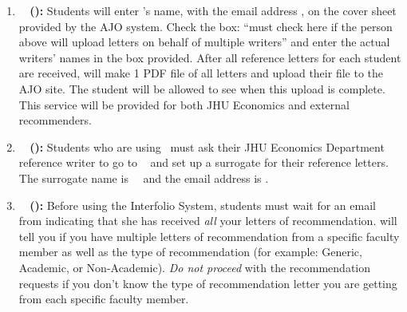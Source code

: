 \documentclass{\econtex}
\begin{document}
\begin{enumerate}
\begin{itemize}
  \end{itemize}

\item \textbf{\AJO ~ (\AJOLink):}
  Students will enter {\JMStaffName}'s name, with the email address \jmstaffemail, on the cover sheet provided by the AJO system. Check the box: ``must check here if the person above will upload letters on behalf of multiple writers'' and enter the actual writers' names in the box provided. After all reference letters for each student are received, {\JMStaffName} will make 1 PDF file of all letters and upload their file to the AJO site. The student will be allowed to see when this upload is complete. This service will be provided for both JHU Economics and external recommenders.

\item \textbf{\AEA ~ (\AEALink):}
  Students who are using \AEA~must ask their JHU Economics Department reference writer to go to \AEARecLink~ and set up a surrogate for their reference letters. The surrogate name is {\JMStaffName}~{\JMStaffNameLast}~and the email address is \jmstaffemail. %

\hypertarget{students-interfolio}{}
\item \textbf{\Interfolio ~ (\InterfolioLink):}
  Before using the Interfolio System, students must wait for an email from {\JMStaffName} indicating that she has received \textit{all} your letters of recommendation. {\JMStaffName} will tell you if you have multiple letters of recommendation from a specific faculty member as well as the type of recommendation (for example: Generic, Academic, or Non-Academic). \textit{Do not proceed} with the recommendation requests if you don't know the type of recommendation letter you are getting from each specific faculty member.


\end{enumerate}
\end{document}
